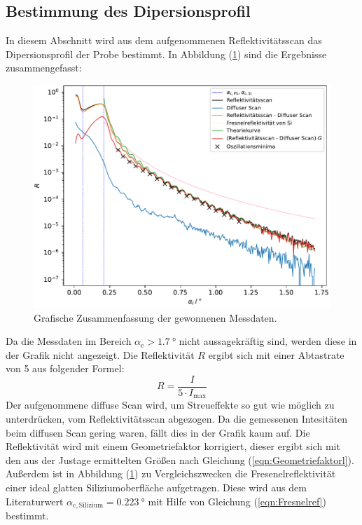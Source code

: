 \subsection{Bestimmung des Dipersionsprofil}
In diesem Abschnitt wird aus dem aufgenommenen Reflektivitätsscan das Dipersionsprofil der Probe bestimmt. In Abbildung (\ref{fig:messungr}) sind die Ergebnisse zusammengefasst:
\begin{figure}[h!]
  \centering
  \includegraphics[scale=0.7]{fig/plot_messung.pdf}
  \caption{Grafische Zusammenfassung der gewonnenen Messdaten.}
  \label{fig:messungr}
\end{figure}
\FloatBarrier
\noindent Da die Messdaten im Bereich $\alpha_\mathrm{e} > \SI{1.7}{\degree}$ nicht aussagekräftig sind, werden diese in der Grafik nicht angezeigt. Die Reflektivität $R$ ergibt sich mit einer Abtastrate von 5 aus folgender Formel:
\begin{equation}
  R=\dfrac{I}{5\cdot I_\mathrm{max}}
\end{equation}
Der aufgenommene diffuse Scan wird, um Streueffekte so gut wie möglich zu unterdrücken, vom Reflektivitätsscan abgezogen. Da die gemessenen Intesitäten beim diffusen Scan gering waren, fällt
dies in der Grafik kaum auf. Die Reflektivität wird mit einem Geometriefaktor korrigiert, dieser ergibt sich mit den aus der Justage ermittelten Größen nach Gleichung (\ref{eqn:Geometriefaktorl}). Außerdem ist in Abbildung (\ref{fig:messungr}) zu Vergleichszwecken die Fresenelreflektivität einer ideal glatten Siliziumoberfläche  aufgetragen.
Diese wird aus dem Literaturwert \cite[5]{Anleitung3} $\alpha_\mathrm{c,Silizium} = \SI{0.223}{\degree}$ mit Hilfe von Gleichung (\ref{eqn:Fresnelref}) bestimmt. \\
\\
